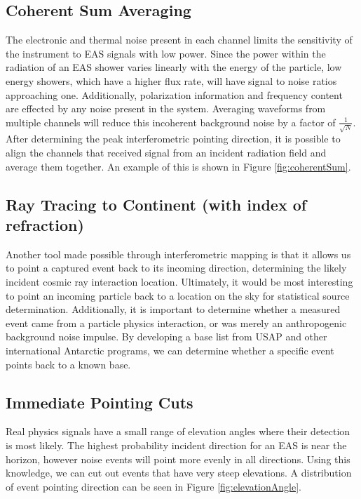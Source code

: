		
	\subsection{Coherent Sum Averaging}
		The electronic and thermal noise present in each channel limits the sensitivity of the instrument to EAS signals with low power.  Since the power within the radiation of an EAS shower varies linearly with the energy of the particle, low energy showers, which have a higher flux rate, will have signal to noise ratios approaching one.  Additionally, polarization information and frequency content are effected by any noise present in the system.  Averaging waveforms from multiple channels will reduce this incoherent background noise by a factor of $\frac{1}{\sqrt{N}}$.  After determining the peak interferometric pointing direction, it is possible to align the channels that received signal from an incident radiation field and average them together.  An example of this is shown in Figure \ref{fig:coherentSum}.
	
	
	\subsection{Ray Tracing to Continent (with index of refraction)}
		Another tool made possible through interferometric mapping is that it allows us to point a captured event back to its incoming direction, determining the likely incident cosmic ray interaction location.  Ultimately, it would be most interesting to point an incoming particle back to a location on the sky for statistical source determination.  Additionally, it is important to determine whether a measured event came from a particle physics interaction, or was merely an anthropogenic background noise impulse.  By developing a base list from USAP and other international Antarctic programs, we can determine whether a specific event points back to a known base.

	
	\subsection{Immediate Pointing Cuts}
		Real physics signals have a small range of elevation angles where their detection is most likely.  The highest probability incident direction for an EAS is near the horizon, however noise events will point more evenly in all directions.  Using this knowledge, we can cut out events that have very steep elevations.  A distribution of event pointing direction can be seen in Figure \ref{fig:elevationAngle}.

